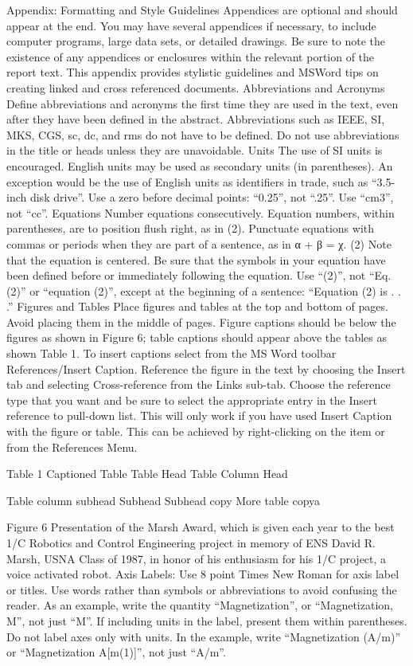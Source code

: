 Appendix:   Formatting and Style Guidelines
Appendices are optional and should appear at the end. You may have several appendices if necessary, to include computer programs, large data sets, or detailed drawings. Be sure to note the existence of any appendices or enclosures within the relevant portion of the report text.  
This appendix provides stylistic guidelines and MSWord tips on creating linked and cross referenced documents.  
Abbreviations and Acronyms
Define abbreviations and acronyms the first time they are used in the text, even after they have been defined in the abstract. Abbreviations such as IEEE, SI, MKS, CGS, sc, dc, and rms do not have to be defined. Do not use abbreviations in the title or heads unless they are unavoidable.
Units
The use of SI units is encouraged. English units may be used as secondary units (in parentheses). An exception would be the use of English units as identifiers in trade, such as “3.5-inch disk drive”. Use a zero before decimal points: “0.25”, not “.25”. Use “cm3”, not “cc”. 
Equations
Number equations consecutively. Equation numbers, within parentheses, are to position flush right, as in (2). Punctuate equations with commas or periods when they are part of a sentence, as in
		α  + β  = χ.					        (2)
Note that the equation is centered. Be sure that the symbols in your equation have been defined before or immediately following the equation. Use “(2)”, not “Eq. (2)” or “equation (2)”, except at the beginning of a sentence: “Equation (2) is . . .”
Figures and Tables
Place figures and tables at the top and bottom of pages. Avoid placing them in the middle of pages. Figure captions should be below the figures as shown in Figure 6; table captions should appear above the tables as shown Table 1. To insert captions select from the MS Word toolbar References/Insert Caption.  Reference the figure in the text by choosing the Insert tab and selecting Cross-reference from the Links sub-tab.  Choose the reference type that you want and be sure to select the appropriate entry in the Insert reference to pull-down list.  This will only work if you have used Insert Caption with the figure or table. This can be achieved by right-clicking on the item or from the References Menu.

Table 1 Captioned Table
Table Head
Table Column Head

Table column subhead
Subhead
Subhead
copy
More table copya




Figure 6 Presentation of the Marsh Award, which is given each year to the best 1/C  Robotics and Control Engineering project in memory of ENS David R.  Marsh, USNA Class of 1987, in honor of his enthusiasm for his 1/C project, a voice activated robot.
Axis Labels: Use 8 point Times New Roman for axis label or titles. Use words rather than symbols or abbreviations to avoid confusing the reader. As an example, write the quantity “Magnetization”, or “Magnetization, M”, not just “M”. If including units in the label, present them within parentheses. Do not label axes only with units. In the example, write “Magnetization (A/m)” or “Magnetization {A[m(1)]}”, not just “A/m”. 

